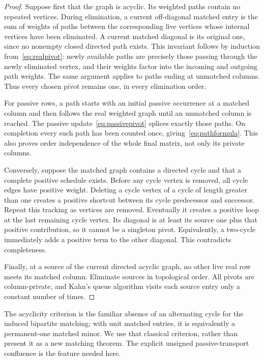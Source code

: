 \documentclass[11pt,letterpaper]{article}
\theoremstyle{definition}
\begin{document}
\begin{proof}
Suppose first that the graph is acyclic. Its weighted paths contain no repeated vertices. During elimination, a current off-diagonal matched entry is the sum of weights of paths between the corresponding live vertices whose internal vertices have been eliminated. A current matched diagonal is its original one, since no nonempty closed directed path exists. This invariant follows by induction from~\eqref{eq:realpivot}: newly available paths are precisely those passing through the newly eliminated vertex, and their weights factor into the incoming and outgoing path weights. The same argument applies to paths ending at unmatched columns. Thus every chosen pivot remains one, in every elimination order.

For passive rows, a path starts with an initial passive occurrence at a matched column and then follows the real weighted graph until an unmatched column is reached. The passive update~\eqref{eq:passivepivot} splices exactly those paths. On completion every such path has been counted once, giving~\eqref{eq:pathformula}. This also proves order independence of the whole final matrix, not only its private columns.

Conversely, suppose the matched graph contains a directed cycle and that a complete positive schedule exists. Before any cycle vertex is removed, all cycle edges have positive weight. Deleting a cycle vertex of a cycle of length greater than one creates a positive shortcut between its cycle predecessor and successor. Repeat this tracking as vertices are removed. Eventually it creates a positive loop at the last remaining cycle vertex. Its diagonal is at least its source one plus that positive contribution, so it cannot be a singleton pivot. Equivalently, a two-cycle immediately adds a positive term to the other diagonal. This contradicts completeness.

Finally, at a source of the current directed acyclic graph, no other live real row meets its matched column. Eliminate sources in topological order. All pivots are column-private, and Kahn's queue algorithm visits each source entry only a constant number of times.
\end{proof}

The acyclicity criterion is the familiar absence of an alternating cycle for the induced bipartite matching; with unit matched entries, it is equivalently a permanent-one matched minor. We use that classical criterion, rather than present it as a new matching theorem. The explicit unsigned passive-transport confluence is the feature needed here.
\end{document}
